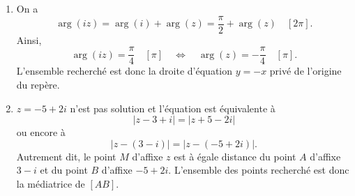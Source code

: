 \begin{enumerate}
\item On a 
\[ \arg(iz)= \arg(i)+ \arg(z)= \frac{\pi}{2}+\arg(z) \quad [2\pi].\]
Ainsi,
\[ \arg(iz) = \frac{\pi}{4} \quad [\pi] \quad \Leftrightarrow \quad \arg(z) = - \frac{\pi}{4} \quad [\pi].\]
L'ensemble recherché est donc la droite d'équation $y=-x$ privé de l'origine du repère. 
\item $z=-5+2i$ n'est pas solution et l'équation est équivalente à 
\[ |z-3+i|=|z+5-2i|\]
ou encore à 
\[ |z-(3-i)|=|z-(-5+2i)|.\]
Autrement dit, le point $M$ d'affixe $z$ est à égale distance du point $A$ d'affixe $3-i$ et du point $B$ d'affixe $-5+2i$. L'ensemble des points recherché est donc la médiatrice de $[AB]$. 
\end{enumerate}